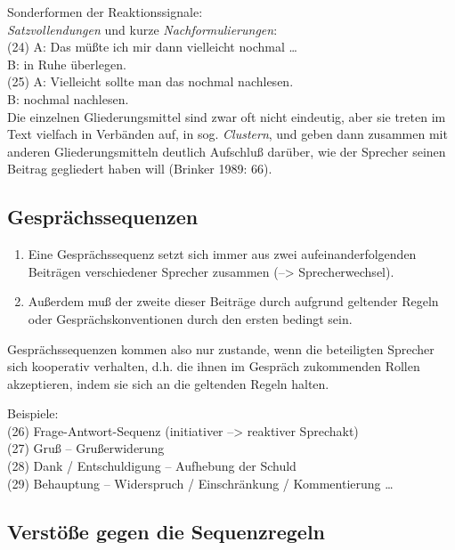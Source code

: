 \documentclass[
  letterpaper,
]{scrbook}
\providecommand{\tightlist}{%
  \setlength{\itemsep}{0pt}\setlength{\parskip}{0pt}}\usepackage{longtable,booktabs,array}
\begin{document}
Sonderformen der Reaktionssignale:\\
\emph{Satzvollendungen} und kurze \emph{Nachformulierungen}:\\
(24) A: Das müßte ich mir dann vielleicht nochmal \ldots{}\\
B: in Ruhe überlegen.\\
(25) A: Vielleicht sollte man das nochmal nachlesen.\\
B: nochmal nachlesen.\\

Die einzelnen Gliederungsmittel sind zwar oft nicht eindeutig, aber sie
treten im Text vielfach in Verbänden auf, in sog. \emph{Clustern}, und
geben dann zusammen mit anderen Gliederungsmitteln deutlich Aufschluß
darüber, wie der Sprecher seinen Beitrag gegliedert haben will (Brinker
1989: 66).

\hypertarget{gespruxe4chssequenzen}{%
\subsection{Gesprächssequenzen}\label{gespruxe4chssequenzen}}

\begin{enumerate}
\def\labelenumi{\arabic{enumi}.}
\tightlist
\item
  Eine Gesprächssequenz setzt sich immer aus zwei aufeinanderfolgenden
  Beiträgen verschiedener Sprecher zusammen (--\textgreater{}
  Sprecherwechsel).\\
\item
  Außerdem muß der zweite dieser Beiträge durch aufgrund geltender
  Regeln oder Gesprächskonventionen durch den ersten bedingt sein.\\
\end{enumerate}

Gesprächssequenzen kommen also nur zustande, wenn die beteiligten
Sprecher sich kooperativ verhalten, d.h. die ihnen im Gespräch
zukommenden Rollen akzeptieren, indem sie sich an die geltenden Regeln
halten.

Beispiele:\\
(26) Frage-Antwort-Sequenz (initiativer --\textgreater{} reaktiver
Sprechakt)\\
(27) Gruß -- Grußerwiderung\\
(28) Dank / Entschuldigung -- Aufhebung der Schuld\\
(29) Behauptung -- Widerspruch / Einschränkung / Kommentierung
\ldots{}\\

\hypertarget{verstuxf6uxdfe-gegen-die-sequenzregeln}{%
\subsection{Verstöße gegen die
Sequenzregeln}\label{verstuxf6uxdfe-gegen-die-sequenzregeln}}
\end{document}
